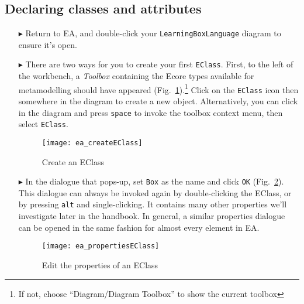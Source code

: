 \newpage
\subsection{Declaring classes and attributes}
\visHeader
\hypertarget{static:classes vis}{}

\begin{itemize}

\item[$\blacktriangleright$] Return to EA, and double-click your \texttt{LearningBoxLanguage} diagram to ensure it's open.

\vspace{0.5cm}

\item[$\blacktriangleright$] There are two ways for you to create your first \texttt{EClass}. First, to the left of the workbench, a \emph{Toolbox} containing
the Ecore types available for metamodelling should have appeared (Fig.~\ref{fig:eclass}).\footnote{If not, choose ``Diagram/Diagram Toolbox'' to show the
current toolbox} Click on the \texttt{EClass} icon then somewhere in the diagram to create a new object. Alternatively, you can click in the diagram and press
\texttt{space} to invoke the toolbox context menu, then select \texttt{EClass}.

\vspace{0.5cm}

\begin{figure}[htbp]
	\centering
  \texttt{[image: ea\_createEClass]}
	\caption{Create an EClass}
	\label{fig:eclass}
\end{figure}

\vspace{0.5cm}

\item[$\blacktriangleright$] In the dialogue that pops-up, set \texttt{Box} as the name and click \texttt{OK} (Fig.~\ref{fig:eclass_properties}).
This dialogue can always be invoked again by double-clicking the EClass, or by pressing \texttt{alt} and single-clicking. It contains many other properties
we'll investigate later in the handbook. In general, a similar properties dialogue can be opened in the same fashion for almost every element in EA.

\clearpage

\begin{figure}[ht]
	\centering
  \texttt{[image: ea\_propertiesEClass]}
	\caption{Edit the properties of an EClass}
	\label{fig:eclass_properties}
\end{figure}


\end{itemize}
